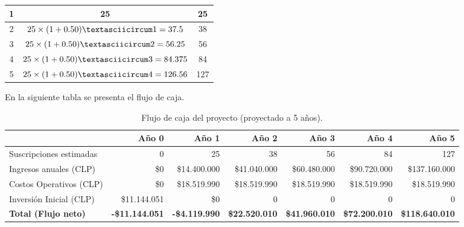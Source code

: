 {\begin{table}[H]
\begin{tabular}{|c|c|c|}
    1 & 25 & 25\\
    \hline
    2 & $25 \times (1 + 0.50)\textasciicircum 1 = 37.5$ & 38\\
    \hline
    3 & $25 \times (1 + 0.50)\textasciicircum 2 = 56.25$ & 56\\
    \hline
    4 & $25 \times (1 + 0.50)\textasciicircum 3 = 84.375$ & 84\\
    \hline
    5 & $25 \times (1 + 0.50)\textasciicircum 4 = 126.56$ & 127\\
    \hline
    
    \end{tabular}
\end{table}

En la siguiente tabla se presenta el flujo de caja.


\begin{table}[H]

    \centering
    
    \caption{Flujo de caja del proyecto (proyectado a 5 años).}
    
    \label{tab:flujo_de_caja}
    
    \small
    
    \begin{tabular}{|l|r|r|r|r|r|r|}
    
    \hline
     & \textbf{Año 0} & \textbf{Año 1} & \textbf{Año 2} & \textbf{Año 3} & \textbf{Año 4} & \textbf{Año 5} \\
    \hline
    
    Suscripciones estimadas & 0 & 25 & 38 & 56 & 84 & 127 \\
    \hline
    Ingresos anuales (CLP) & \$0 & \$14.400.000 & \$41.040.000 & \$60.480.000 & \$90.720.000 & \$137.160.000 \\
    \hline
    Costos Operativos (CLP) & \$0 & \$18.519.990 & \$18.519.990 & \$18.519.990 & \$18.519.990 & \$18.519.990 \\
    \hline
    Inversión Inicial (CLP) & \$11.144.051 & \$0 & 0 & 0 & 0 & 0 \\
    \hline
    \textbf{Total (Flujo neto)} & \textbf{-\$11.144.051} & \textbf{-\$4.119.990} & \textbf{\$22.520.010} & \textbf{\$41.960.010} & \textbf{\$72.200.010} & \textbf{\$118.640.010} \\
    \hline
    

\end{tabular}
\end{table}}
